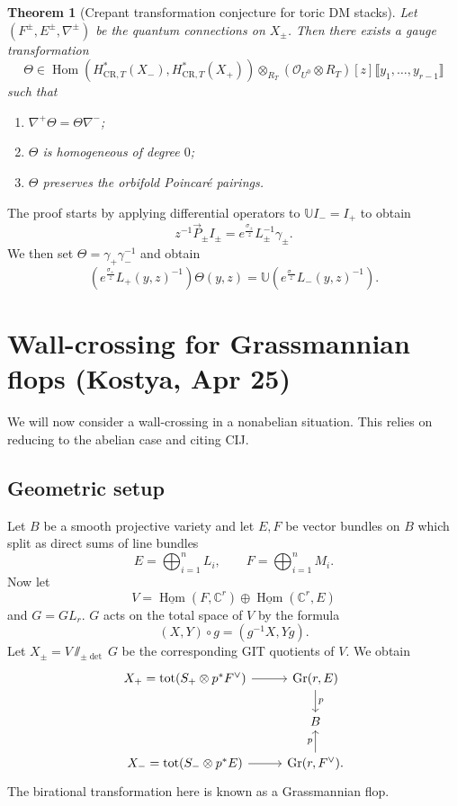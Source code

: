 \documentclass[leqno, openany]{memoir}
\newtheorem{thm}{Theorem}[section]
\theoremstyle{definition}
\theoremstyle{remark}
\theoremstyle{plain}
\theoremstyle{definition}
\theoremstyle{remark}
\newcommand{\C}{\mathbb{C}}
\newcommand{\U}{\mathbb{U}}
\newcommand{\mc}[1]{\mathcal{#1}}
\newcommand{\mr}[1]{\mathrm{#1}}
\newcommand{\on}[1]{\operatorname{#1}}
\newcommand{\ul}[1]{\underline{#1}}
\DeclareMathOperator{\Hom}{Hom}
\begin{document}
\begin{thm}[Crepant transformation conjecture for toric DM stacks]
    Let $(F^{\pm}, E^{\pm}, \nabla^{\pm})$ be the quantum connections on $X_{\pm}$. Then there exists a gauge transformation
    \[ \Theta \in \Hom(H_{\mr{CR}, T}^*(X_-), H_{\mr{CR}, T}^*(X_+)) \otimes_{R_T} ( \mc{O}_{U^0} \otimes R_T )[z]\llbracket y_1, \ldots, y_{r-1} \rrbracket \]
    such that
    \begin{enumerate}
        \item $\nabla^+ \Theta = \Theta \nabla^-$;
        \item $\Theta$ is homogeneous of degree $0$;
        \item $\Theta$ preserves the orbifold Poincar\'e pairings.
    \end{enumerate}
\end{thm}

The proof starts by applying differential operators to $\U I_- = I_+$ to obtain
\[ z^{-1} \vec{P}_{\pm} I_{\pm} = e^{\frac{\sigma_{\pm}}{z}}L_{\pm}^{-1} \gamma_{\pm}. \]
We then set $\Theta = \gamma_+ \gamma_-^{-1}$ and obtain
\[ (e^{\frac{\sigma_+}{z}} L_+(y,z)^{-1}) \Theta(y,z) = \U (e^{\frac{\sigma_-}{z}}L_-(y,z)^{-1}). \]

\section{Wall-crossing for Grassmannian flops (Kostya, Apr 25)}%
\label{sec:Wall-crossing for Grassmannian flops}

We will now consider a wall-crossing in a nonabelian situation. This relies on reducing to the abelian case and citing CIJ.

\subsection{Geometric setup}%
\label{sub:Geometric setup}

Let $B$ be a smooth projective variety and let $E, F$ be vector bundles on $B$ which split as direct sums of line bundles
\[ E = \bigoplus_{i=1}^n L_i, \qquad F = \bigoplus_{i=1}^n M_i. \]
Now let 
\[ V = \ul{\Hom}(F, \C^r) \oplus \ul{\Hom}(\C^r, E) \]
and $G = GL_r$. $G$ acts on the total space of $V$ by the formula
\[ (X,Y) \circ g = (g^{-1} X, Yg). \]
Let $X_{\pm} = V \sslash_{\pm \det} G$ be the corresponding GIT quotients of $V$. We obtain
\begin{equation*}
\begin{tikzcd}
    X_+ = \on{tot}(S_+ \otimes p^* F^{\vee}) \ar{r} & \on{Gr}(r, E) \ar{d}{p} \\
    & B \\
    X_- = \on{tot}(S_- \otimes p^* E) \ar{r} & \on{Gr}(r, F^{\vee}) \ar{u}{p}.
\end{tikzcd}
\end{equation*}
The birational transformation here is known as a Grassmannian flop.
\end{document}
